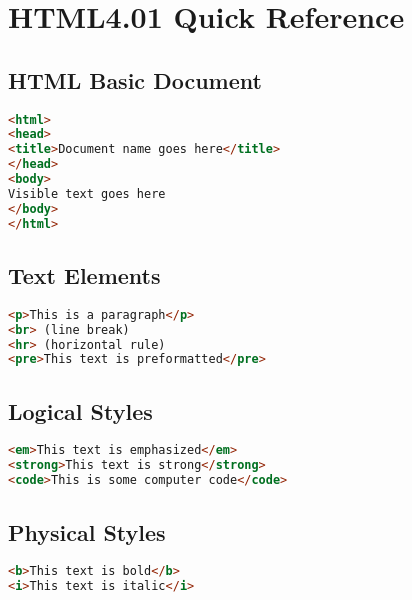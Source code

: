 
























\chapter{HTML4.01 Quick Reference}



\section{HTML Basic Document}

\begin{lstlisting}[language=HTML]
<html>
<head>
<title>Document name goes here</title>
</head>
<body>
Visible text goes here
</body>
</html>
\end{lstlisting}

\section{Text Elements}

\begin{lstlisting}[language=HTML]
<p>This is a paragraph</p>
<br> (line break)
<hr> (horizontal rule)
<pre>This text is preformatted</pre>
\end{lstlisting}

\section{Logical Styles}

\begin{lstlisting}[language=HTML]
<em>This text is emphasized</em>
<strong>This text is strong</strong>
<code>This is some computer code</code>
\end{lstlisting}


\section{Physical Styles}

\begin{lstlisting}[language=HTML]
<b>This text is bold</b>
<i>This text is italic</i>
\end{lstlisting}


